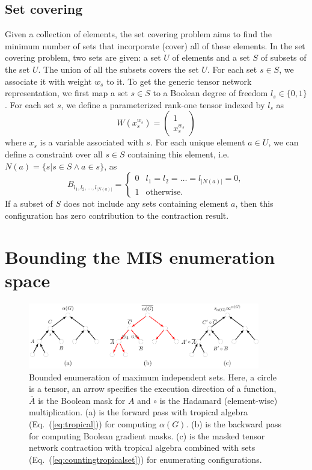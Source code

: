 \documentclass[onefignum, onetabnum]{siamart190516}
\newcommand{\<}{\langle}
\renewcommand{\>}{\rangle}
\newcommand{\Eq}[1]{Eq.~(\ref{#1})}
\begin{document}
\subsection{Set covering}
Given a collection of elements, the set covering problem aims to find the minimum number of sets that incorporate (cover) all of these elements.
In the set covering problem, two sets are given: a set $U$ of elements and a set $S$ of subsets of the set $U$. The union of all the subsets covers the set $U$. For each set $s \in S$, we associate it with weight $w_s$ to it.
To get the generic tensor network representation, we first map a set $s\in S$ to a Boolean degree of freedom $l_s\in\{0, 1\}$.
For each set $s$, we define a parameterized rank-one tensor indexed by $l_s$ as
\begin{equation}
W(x_s^{w_s}) = \left(\begin{matrix}
    1 \\
    x_s^{w_s}
    \end{matrix}\right)
\end{equation}
where $x_s$ is a variable associated with $s$.
For each unique element $a \in U$, we can define a constraint over all $s \in S$ containing this element, i.e. $N(a) = \{s | s \in S \land a\in s\}$, as
\begin{equation}
B_{l_1,l_2,\ldots,l_{|N(a)|}} = \begin{cases}
    0 & l_1=l_2=\ldots=l_{|N(a)|}=0,\\
    1 & \text{otherwise}.
\end{cases}
\end{equation}
If a subset of $S$ does not include any sets containing element $a$, then this configuration has zero contribution to the contraction result.

\section{Bounding the MIS enumeration space}\label{sec:bounding}
\begin{figure}
    \centering
    \includegraphics[width=0.9\textwidth, trim={0cm 0cm 0cm 0cm}, clip]{figures/masktree.pdf}
    \caption{Bounded enumeration of maximum independent sets. Here, a circle is a tensor, an arrow specifies the execution direction of a function, $\overline A$ is the Boolean mask for $A$ and $\circ$ is the Hadamard (element-wise) multiplication. (a) is the forward pass with tropical algebra (\Eq{eq:tropical}) for computing $\alpha(G)$.
     (b) is the backward pass for computing Boolean gradient masks.
     (c) is the masked tensor network contraction with tropical algebra combined with sets (\Eq{eq:countingtropicalset}) for enumerating configurations.}
     \label{fig:bounding}
\end{figure}
\end{document}
